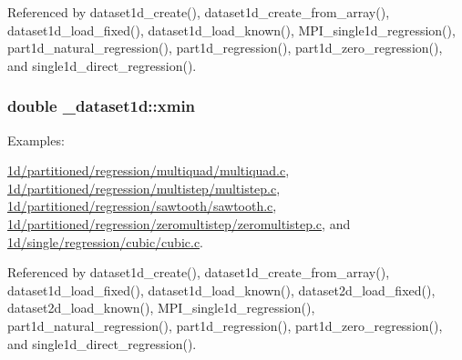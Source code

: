 Referenced by dataset1d\+\_\+create(), dataset1d\+\_\+create\+\_\+from\+\_\+array(), dataset1d\+\_\+load\+\_\+fixed(), dataset1d\+\_\+load\+\_\+known(), M\+P\+I\+\_\+single1d\+\_\+regression(), part1d\+\_\+natural\+\_\+regression(), part1d\+\_\+regression(), part1d\+\_\+zero\+\_\+regression(), and single1d\+\_\+direct\+\_\+regression().

\subsubsection[{\texorpdfstring{xmin}{xmin}}]{\setlength{\rightskip}{0pt plus 5cm}double \+\_\+dataset1d\+::xmin}\hypertarget{struct__dataset1d_ae96bdad176cb1e2ff691de6cd46b577b}{}\label{struct__dataset1d_ae96bdad176cb1e2ff691de6cd46b577b}
\begin{Desc}
\item[Examples\+: ]\par
\hyperlink{1d_2partitioned_2regression_2multiquad_2multiquad_8c-example}{1d/partitioned/regression/multiquad/multiquad.\+c}, \hyperlink{1d_2partitioned_2regression_2multistep_2multistep_8c-example}{1d/partitioned/regression/multistep/multistep.\+c}, \hyperlink{1d_2partitioned_2regression_2sawtooth_2sawtooth_8c-example}{1d/partitioned/regression/sawtooth/sawtooth.\+c}, \hyperlink{1d_2partitioned_2regression_2zeromultistep_2zeromultistep_8c-example}{1d/partitioned/regression/zeromultistep/zeromultistep.\+c}, and \hyperlink{1d_2single_2regression_2cubic_2cubic_8c-example}{1d/single/regression/cubic/cubic.\+c}.\end{Desc}


Referenced by dataset1d\+\_\+create(), dataset1d\+\_\+create\+\_\+from\+\_\+array(), dataset1d\+\_\+load\+\_\+fixed(), dataset1d\+\_\+load\+\_\+known(), dataset2d\+\_\+load\+\_\+fixed(), dataset2d\+\_\+load\+\_\+known(), M\+P\+I\+\_\+single1d\+\_\+regression(), part1d\+\_\+natural\+\_\+regression(), part1d\+\_\+regression(), part1d\+\_\+zero\+\_\+regression(), and single1d\+\_\+direct\+\_\+regression().

